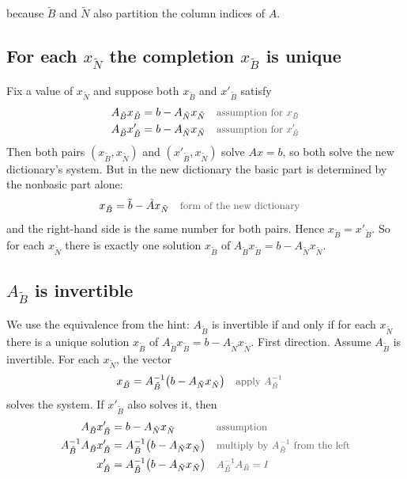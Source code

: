 \documentclass[a4paper,11pt]{article}
\newif\ifexplain
\newcommand{\teil}[1]{\subsection*{#1}}
\newcommand{\why}[1]{\text{\small\color{black!65}#1}}
\newcommand{\explain}[1]{\ifexplain\begin{erklbox}#1\end{erklbox}\fi}
\begin{document}
because $\tilde B$ and $\tilde N$ also partition the column indices of $A$.
\explain{Das ist die erste der drei angekündigten Eigenschaften aus dem Hinweis. Sie liefert Zulässigkeit: Für jedes $x_{\tilde N}$ ist der Wert $x_{\tilde B}=\tilde b-\tilde Ax_{\tilde N}$ aus dem Dictionary mindestens eine Lösung des Gleichungssystems $A_{\tilde B}x_{\tilde B}=b-A_{\tilde N}x_{\tilde N}$. Es fehlt noch die Eindeutigkeit.}
\teil{For each $x_{\tilde N}$ the completion $x_{\tilde B}$ is unique}
Fix a value of $x_{\tilde N}$ and suppose both $x_{\tilde B}$ and $x'_{\tilde B}$ satisfy
\begin{align*}
A_{\tilde B}x_{\tilde B}&=b-A_{\tilde N}x_{\tilde N}&&\why{assumption for $x_{\tilde B}$}\\
A_{\tilde B}x'_{\tilde B}&=b-A_{\tilde N}x_{\tilde N}&&\why{assumption for $x'_{\tilde B}$}
\end{align*}
Then both pairs $(x_{\tilde B},x_{\tilde N})$ and $(x'_{\tilde B},x_{\tilde N})$ solve $Ax=b$, so both solve the new dictionary's system. But in the new dictionary the basic part is determined by the nonbasic part alone:
\begin{align*}
x_{\tilde B}&=\tilde b-\tilde Ax_{\tilde N}&&\why{form of the new dictionary}
\end{align*}
and the right-hand side is the same number for both pairs. Hence $x_{\tilde B}=x'_{\tilde B}$. So for each $x_{\tilde N}$ there is exactly one solution $x_{\tilde B}$ of $A_{\tilde B}x_{\tilde B}=b-A_{\tilde N}x_{\tilde N}$.
\explain{Das Argument benutzt beide Richtungen der Äquivalenz: Jedes Paar aus dem Dictionary löst $Ax=b$, und umgekehrt löst jedes Paar, das $Ax=b$ löst, das Dictionary. Deshalb kann es zu festem $x_{\tilde N}$ nur ein passendes $x_{\tilde B}$ geben. Genau das ist die zweite Eigenschaft aus dem Hinweis.}
\teil{$A_{\tilde B}$ is invertible}
We use the equivalence from the hint: $A_{\tilde B}$ is invertible if and only if for each $x_{\tilde N}$ there is a unique solution $x_{\tilde B}$ of $A_{\tilde B}x_{\tilde B}=b-A_{\tilde N}x_{\tilde N}$.
First direction. Assume $A_{\tilde B}$ is invertible. For each $x_{\tilde N}$, the vector
\begin{align*}
x_{\tilde B}&=A_{\tilde B}^{-1}\bigl(b-A_{\tilde N}x_{\tilde N}\bigr)&&\why{apply $A_{\tilde B}^{-1}$}
\end{align*}
solves the system. If $x'_{\tilde B}$ also solves it, then
\begin{align*}
A_{\tilde B}x'_{\tilde B}&=b-A_{\tilde N}x_{\tilde N}&&\why{assumption}\\
A_{\tilde B}^{-1}A_{\tilde B}x'_{\tilde B}&=A_{\tilde B}^{-1}\bigl(b-A_{\tilde N}x_{\tilde N}\bigr)&&\why{multiply by $A_{\tilde B}^{-1}$ from the left}\\
x'_{\tilde B}&=A_{\tilde B}^{-1}\bigl(b-A_{\tilde N}x_{\tilde N}\bigr)&&\why{$A_{\tilde B}^{-1}A_{\tilde B}=I$}
\end{align*}
\end{document}
